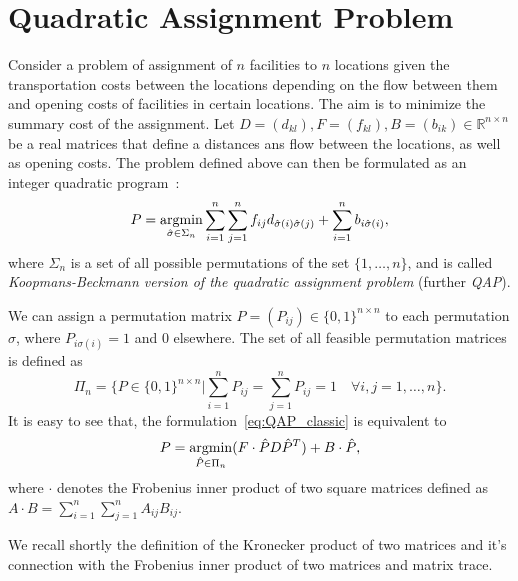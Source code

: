 \chapter{Quadratic Assignment Problem}\label{appendixA}
Consider a problem of assignment of $n$ facilities to $n$ locations given the transportation costs between the locations depending on the flow between them and opening costs of facilities in certain locations. The aim is to minimize the summary cost of the assignment. Let $D=(d_{kl}),F=(f_{kl}), B=(b_{ik})\in\mathbb{R}^{n\times n}$ be a real matrices that define a distances ans flow between the locations, as well as opening costs. The problem defined above can then be formulated as an integer quadratic program~\cite{Burkard98thequadratic,Koopman_Backman}:
\begin{equation}\label{eq:QAP_classic}
P = \mathop{\rm argmin}_{\hat{\sigma}\in\Sigma_n}\sum_{i=1}^{n}\sum_{j=1}^{n}f_{ij}d_{\hat{\sigma}(i)\hat{\sigma}(j)}+\sum_{i=1}^{n}b_{i\hat{\sigma}(i)},
\end{equation}
where $\Sigma_n$ is a set of all possible permutations of the set $\{1,\dots,n\}$, and is called \emph{Koopmans-Beckmann version of the quadratic assignment problem} (further \emph{QAP}). %


We can assign a permutation matrix $P=(P_{ij})\in\{0,1\}^{n\times n}$ to each permutation $\sigma$, where $P_{i\sigma(i)}=1$ and $0$ elsewhere. The set of all feasible permutation matrices is defined as
\begin{equation*}
\Pi_n=\{P\in\{0,1\}^{n\times n}|\sum_{i=1}^{n}P_{ij}=\sum_{j=1}^{n}P_{ij}=1\quad\forall i,j=1,\dots,n\}.
\end{equation*}
It is easy to see that, the formulation~\eqref{eq:QAP_classic} %
is equivalent to
\begin{equation}\label{eq:QAP_classic2}
P = \mathop{\rm argmin}_{\hat{P}\in\Pi_n}(F\cdot \hat{P}D\hat{P}^T)+B\cdot\hat{P},
\end{equation}
where $\cdot$ denotes the Frobenius inner product of two square matrices defined as $A\cdot B=\sum_{i=1}^{n}\sum_{j=1}^{n}A_{ij}B_{ij}$.

We recall shortly the definition of the Kronecker product of two matrices and it's connection with the Frobenius inner product of two matrices and matrix trace.

